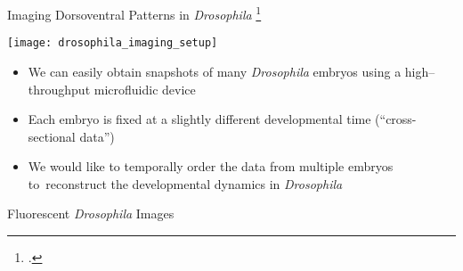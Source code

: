 \begin{frame}{Imaging Dorsoventral Patterns in {\em Drosophila} \footcite{chung2010microfluidic}}

	\centering
    \texttt{[image: drosophila\_imaging\_setup]}
    
	\begin{itemize}
        \item We can easily obtain snapshots of many {\em Drosophila} embryos using a high--throughput microfluidic device
        \item Each embryo is fixed at a slightly different developmental time (``cross-sectional data'')
        \item We would like to temporally order the data from multiple embryos to~reconstruct the developmental dynamics in {\em Drosophila}
    \end{itemize}
\end{frame}


\begin{frame}{Fluorescent {\em Drosophila} Images}
	 
	\drawunordered
	
	\drawdownarrow
	

\end{frame}

